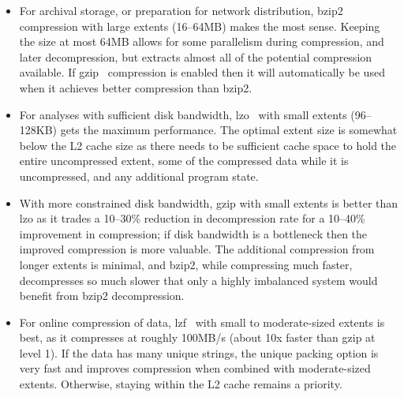\documentclass{acm_proc_article-sp}
\begin{document}
\begin{itemize}

\item For archival storage, or preparation for network distribution,
bzip2~\cite{BZIP} compression with large extents (16--64MB) makes the
most sense.  Keeping the size at most 64MB allows for some parallelism
during compression, and later decompression, but extracts almost all
of the potential compression available.  If gzip~\cite{GZIP}
compression is enabled then it will automatically be used when it
achieves better compression than bzip2.


\item For analyses with sufficient disk bandwidth, lzo~\cite{LZO} with
small extents (96--128KB) gets the maximum performance.  The optimal
extent size is somewhat below the L2 cache size as there needs to be
sufficient cache space to hold the entire uncompressed extent, some of
the compressed data while it is uncompressed, and any additional
program state.

\item With more constrained disk bandwidth, gzip
with
small extents is better than lzo as it trades a 10--30\% reduction in
decompression rate for a 10--40\% improvement in compression; if disk
bandwidth is a 
bottleneck then the improved compression is more valuable.
The additional compression from longer extents is minimal, and bzip2,
while compressing much faster, decompresses so much slower that only a
highly imbalanced system would benefit from bzip2 decompression.

\item For online compression of data, lzf~\cite{LZF} with small to
moderate-sized extents is 
best, as it compresses at roughly 100MB/s (about 10x
faster than gzip at level 1).
If the data has many unique strings, the unique packing option
is very fast and improves compression when combined with 
moderate-sized extents.
Otherwise, staying within the L2 cache remains a priority.
\end{itemize}
\end{document}
